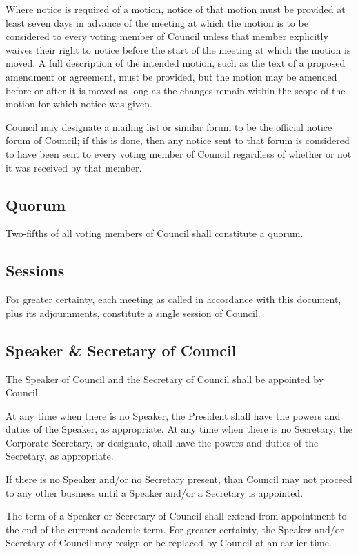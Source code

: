 Where notice is required of a motion, notice of that motion must be provided at
least seven days in advance of the meeting at which the motion is to be
considered to every voting member of Council unless that member
explicitly waives their right to notice before the start of the meeting at
which the motion is moved. A full description of the intended motion, such as
the text of a proposed amendment or agreement, must be provided, but the motion
may be amended before or after it is moved as long as the changes remain within
the scope of the motion for which notice was given.

Council may designate a mailing list or similar forum to be the
official notice forum of Council; if this is done, then any notice
sent to that forum is considered to have been sent to every voting member of
Council regardless of whether or not it was received by that member.

\subsection{Quorum}
Two-fifths of all voting members of Council shall constitute a
quorum.

\subsection{Sessions}
For greater certainty, each meeting as called in accordance with this document,
plus its adjournments, constitute a single session of Council.

\subsection{Speaker \& Secretary of Council}
The Speaker of Council and the Secretary of Council shall
be appointed by Council. 

At any time when there is no Speaker, the President shall have the powers and
duties of the Speaker, as appropriate.  At any time when there is no Secretary,
the Corporate Secretary, or designate, shall have the powers and duties of the
Secretary, as appropriate.

If there is no Speaker and/or no Secretary present, than Council may
not proceed to any other business until a Speaker and/or a Secretary is
appointed. 

The term of a Speaker or Secretary of Council shall extend from 
appointment to the end of the current academic term. For greater certainty,
the Speaker and/or Secretary of Council may resign or be replaced by
Council at an earlier time. 

